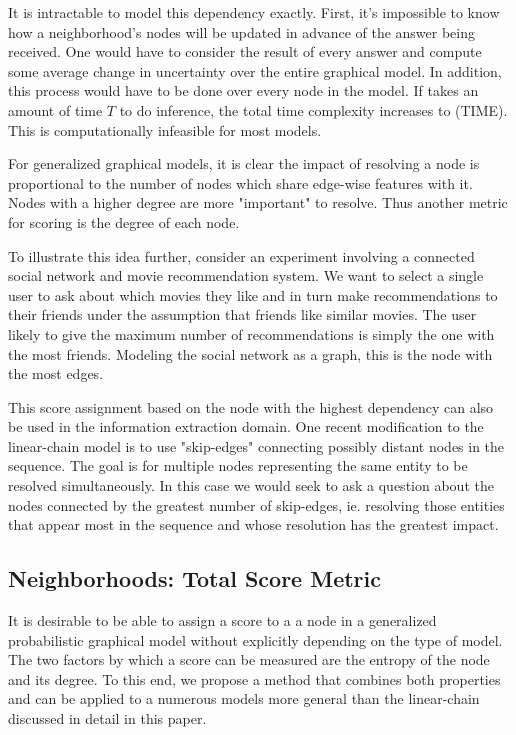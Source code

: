 It is intractable to model this dependency exactly.  First, it's impossible to know how a neighborhood's nodes will be updated in advance of the answer being received.  One would have to consider the result of every answer and compute some average change in uncertainty over the entire graphical model.  In addition, this process would have to be done over every node in the model.  If takes an amount of time $T$ to do inference, the total time complexity increases to (TIME).  This is computationally infeasible for most models.

For generalized graphical models, it is clear the impact of resolving a node is proportional to the number of nodes which share edge-wise features with it.  Nodes with a higher degree are more "important" to resolve.  Thus another metric for scoring is the degree of each node.

To illustrate this idea further, consider an experiment involving a connected social network and movie recommendation system.  We want to select a single user to ask about which movies they like and in turn make recommendations to their friends under the assumption that friends like similar movies.  The user likely to give the maximum number of recommendations is simply the one with the most friends.  Modeling the social network as a graph, this is the node with the most edges.

This score assignment based on the node with the highest dependency can also be used in the information extraction domain.  One recent modification to the linear-chain model is to use "skip-edges" connecting possibly distant nodes in the sequence.  The goal is for multiple nodes representing the same entity to be resolved simultaneously.  In this case we would seek to ask a question about the nodes connected by the greatest number of skip-edges, ie. resolving those entities that appear most in the sequence and whose resolution has the greatest impact.

\subsection{Neighborhoods: Total Score Metric}
It is desirable to be able to assign a score to a a node in a generalized probabilistic graphical model without explicitly depending on the type of model.  The two factors by which a score can be measured are the entropy of the node and its degree.  To this end, we propose a method that combines both properties and can be applied to a numerous models more general than the linear-chain discussed in detail in this paper.

